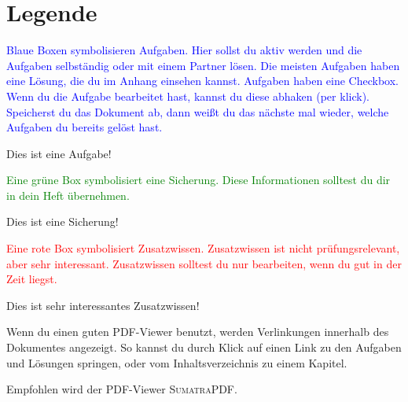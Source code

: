 \section*{Legende}

\textcolor{blue}{
Blaue Boxen symbolisieren Aufgaben.
Hier sollst du aktiv werden und die Aufgaben selb\-ständig oder mit einem Partner lösen.
Die meisten Aufgaben haben eine Lösung, die du im Anhang einsehen kannst.
Aufgaben haben eine Checkbox. Wenn du die Aufgabe bearbeitet hast, kannst du diese abhaken (per klick).
Speicherst du das Dokument ab, dann weißt du das nächste mal wieder, welche Aufgaben du bereits gelöst hast.
}

\begin{AufgabeON}
\marginnote{
\begin{Form}
    \CheckBox[width=.6cm,name=legende]{~}
\end{Form}
}
Dies ist eine Aufgabe!
\end{AufgabeON}

\textcolor{green}{
Eine grüne Box symbolisiert eine Sicherung.
Diese Informationen solltest du dir in dein Heft übernehmen.
}

\begin{sich}
Dies ist eine Sicherung!
\end{sich}

\textcolor{red}{
Eine rote Box symbolisiert Zusatzwissen.
Zusatzwissen ist nicht prüfungsrelevant, aber sehr interessant.
Zusatzwissen solltest du nur bearbeiten, wenn du gut in der Zeit liegst.
}

\begin{ZW}
Dies ist sehr interessantes Zusatzwissen!
\end{ZW}

Wenn du einen guten PDF-Viewer benutzt, werden Verlinkungen innerhalb des Dokumentes angezeigt. So kannst du durch Klick auf einen Link zu den Aufgaben und Lösungen springen, oder vom Inhaltsverzeichnis  zu einem Kapitel.

Empfohlen wird der PDF-Viewer \textsc{SumatraPDF}.